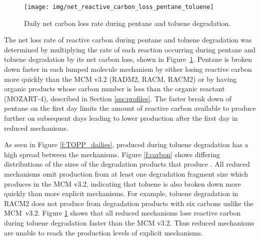 %
\begin{figure}
    \centering
    \texttt{[image: img/net\_reactive\_carbon\_loss\_pentane\_toluene]}
    \vspace{0mm}
    \caption{Daily net carbon loss rate during pentane and toluene degradation.}
    \vspace{-4mm}
    \label{f:net_carbon_loss}
\end{figure}
%
The net loss rate of reactive carbon during pentane and toluene degradation was determined by multiplying the rate of each reaction occurring during pentane and toluene degradation by its net carbon loss, shown in \mbox{Figure \ref{f:net_carbon_loss}}.
Pentane is broken down faster in each lumped molecule mechanism by either losing reactive carbon more quickly than the MCM v3.2 (RADM2, RACM, RACM2) or by having organic products whose carbon number is less than the organic reactant (MOZART-4), described in Section \ref{sss:profiles}.
The faster break down of pentane on the first day limits the amount of reactive carbon available to produce further  on subsequent days leading to lower  production after the first day in reduced mechanisms.

As seen in Figure \ref{f:TOPP_dailies},  produced during toluene degradation has a high spread between the mechanisms.
Figure \ref{f:carbon} shows differing distributions of the sizes of the degradation products that produce .
All reduced mechanisms omit  production from at least one degradation fragment size which produces  in the MCM v3.2, indicating that toluene is also broken down more quickly than more explicit mechanisms.
For example, toluene degradation in RACM2 does not produce  from degradation products with six carbons unlike the \mbox{MCM v3.2}.  
Figure \ref{f:net_carbon_loss} shows that all reduced mechanisms lose reactive carbon during toluene degradation faster than the MCM v3.2.
Thus reduced mechanisms are unable to reach the  production levels of explicit mechanisms.
